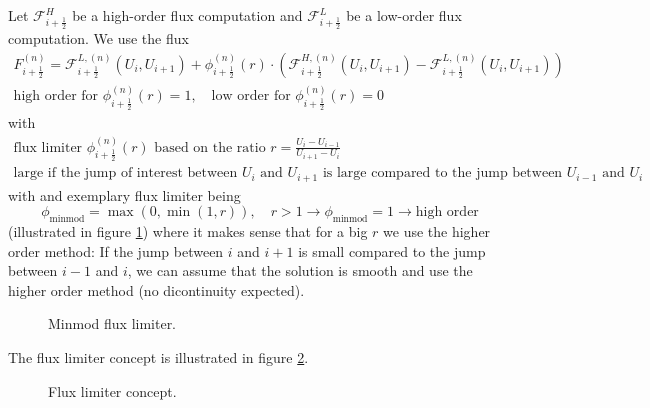Let $\mathcal{F}^H_{i+\frac{1}{2}}$ be a high-order flux computation and $\mathcal{F}^L_{i+\frac{1}{2}}$ be a low-order flux computation.
We use the flux
\begin{equation}
    \begin{gathered}
        F_{i+\frac{1}{2}}^{(n)}=\mathcal{F}_{i+\frac{1}{2}}^{L,(n)}\left(U_i, U_{i+1}\right)+\phi_{i+\frac{1}{2}}^{(n)}(r) \cdot\left(\mathcal{F}_{i+\frac{1}{2}}^{H,(n)}\left(U_i, U_{i+1}\right)-\mathcal{F}_{i+\frac{1}{2}}^{L,(n)}\left(U_i, U_{i+1}\right)\right) \\
        \text{high order for } \phi_{i+\frac{1}{2}}^{(n)}(r) = 1, \quad \text{low order for } \phi_{i+\frac{1}{2}}^{(n)}(r) = 0
    \end{gathered}
\end{equation}
with
\begin{equation}
    \begin{gathered}
        \text{flux limiter } \phi_{i+\frac{1}{2}}^{(n)}(r) \text{ based on the ratio } r = \frac{U_i - U_{i-1}}{U_{i+1} - U_{i}} \\
        \text{large if the jump of interest between } U_i \text{ and } U_{i+1} \text{ is large compared to the jump between } U_{i-1} \text{ and } U_{i}
    \end{gathered}
\end{equation}
with and exemplary flux limiter being
\begin{equation}
    \phi_{\text{minmod}} = \max(0, \min(1, r)), \quad r > 1 \rightarrow \phi_{\text{minmod}} = 1 \rightarrow \text{high order}
\end{equation}
(illustrated in figure \ref{fig:minmod}) where it makes sense that for a big $r$ we use the higher order method: \textcolor{blue1}{If the jump between $i$ and $i+1$ is small compared to the jump between $i-1$ and $i$, we can assume that the solution is smooth and use the higher order method (no dicontinuity expected).}

\begin{figure}[htb!]
    \centering
    
    \caption{Minmod flux limiter.}
    \label{fig:minmod}
\end{figure}

The flux limiter concept is illustrated in figure \ref{fig:flux_limiter}.

\begin{figure}[htb!]
    \centering
    
    \caption{Flux limiter concept.}
    \label{fig:flux_limiter}
\end{figure}

